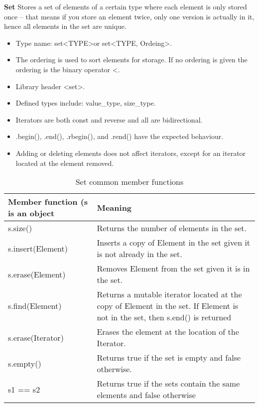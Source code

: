 \noindent
\textbf{Set}
Stores a set of elements of a certain type where each element is only stored once --
that means if you store an element twice, only one version is actually in it, hence
all elements in the set are unique.

\begin{itemize}
	\item Type name: set\textless TYPE\textgreater or set\textless TYPE, Ordeing\textgreater.
	\item The ordering is used to sort elements for storage. If no ordering is given
	the ordering is the binary operator \textless.
	\item Library header \textless set\textgreater.
	\item Defined types include: value\_type, size\_type.
	\item Iterators are both const and reverse and all are bidirectional.
	\item .begin(), .end(), .rbegin(), and .rend() have the expected behaviour.
	\item Adding or deleting elements does not affect iterators, except for an iterator
	located at the element removed.
\end{itemize}

\begin{table}[H]
\begin{center}
\renewcommand{\arraystretch}{1.8}
\begin{tabular}{ m{4.5cm} m{11cm}} 
\textbf{Member function (s is an object} & \textbf{Meaning}\\
\hline

s.size() & Returns the number of elements in the set.\\
\hline

s.insert(Element) & Inserts a copy of Element in the set given it is not
already in the set.\\
\hline

s.erase(Element) & Removes Element from the set given it is in the set.\\
\hline

s.find(Element) & Returns a mutable iterator located at the copy of
Element in the set. If Element is not in the set, then s.end() is returned\\
\hline

s.erase(Iterator) & Erases the element at the location of the Iterator.\\
\hline

s.empty() & Returns true if the set is empty and false otherwise.\\
\hline

s1 == s2 & Returns true if the sets contain the same elements and false otherwise\\
\hline
\end{tabular}
\end{center}
\caption{Set common member functions}
\label{table_1}
\end{table}

